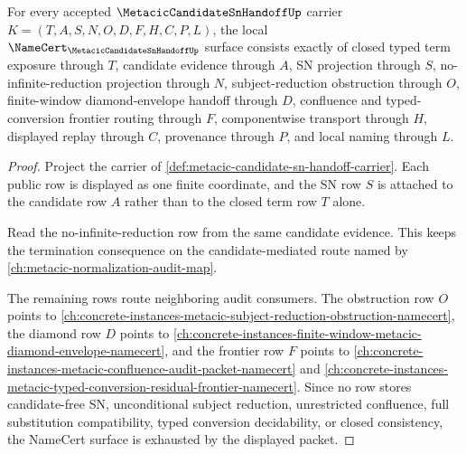 \begin{theorem}
\label{thm:metacic-candidate-sn-handoff-obligations}
For every accepted $\MetacicCandidateSnHandoffUp$ carrier $K=(T,A,S,N,O,D,F,H,C,P,L)$, the local $\NameCert_{\MetacicCandidateSnHandoffUp}$ surface consists exactly of closed typed term exposure through $T$, candidate evidence through $A$, SN projection through $S$, no-infinite-reduction projection through $N$, subject-reduction obstruction through $O$, finite-window diamond-envelope handoff through $D$, confluence and typed-conversion frontier routing through $F$, componentwise transport through $H$, displayed replay through $C$, provenance through $P$, and local naming through $L$.
\end{theorem}
\begin{proof}
Project the carrier of \autoref{def:metacic-candidate-sn-handoff-carrier}. Each public row is displayed as one finite coordinate, and the SN row $S$ is attached to the candidate row $A$ rather than to the closed term row $T$ alone.

Read the no-infinite-reduction row from the same candidate evidence. This keeps the termination consequence on the candidate-mediated route named by \autoref{ch:metacic-normalization-audit-map}.

The remaining rows route neighboring audit consumers. The obstruction row $O$ points to \autoref{ch:concrete-instances-metacic-subject-reduction-obstruction-namecert}, the diamond row $D$ points to \autoref{ch:concrete-instances-finite-window-metacic-diamond-envelope-namecert}, and the frontier row $F$ points to \autoref{ch:concrete-instances-metacic-confluence-audit-packet-namecert} and \autoref{ch:concrete-instances-metacic-typed-conversion-residual-frontier-namecert}. Since no row stores candidate-free SN, unconditional subject reduction, unrestricted confluence, full substitution compatibility, typed conversion decidability, or closed consistency, the NameCert surface is exhausted by the displayed packet.
\end{proof}

